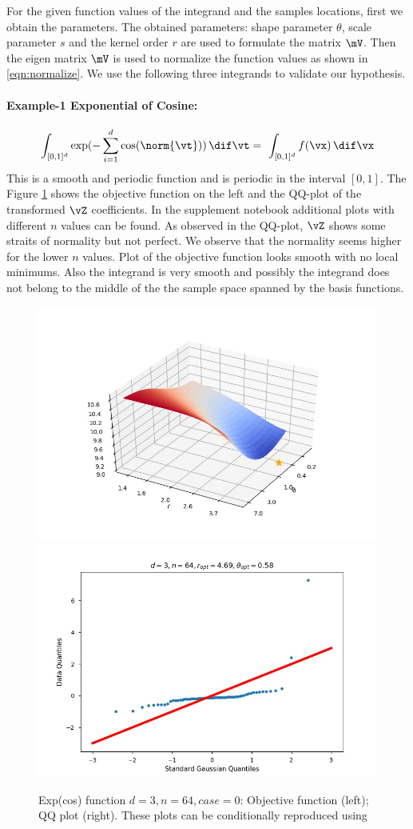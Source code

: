 For the given function values of the integrand and the samples locations, first we obtain the parameters. The obtained parameters: shape parameter $\theta$,  scale parameter $s$ and the kernel order $r$ are used to formulate the matrix $\mV$. Then the eigen matrix $\mV$ is used to normalize the function values as shown in \eqref{eqn:normalize}.
We use the following three integrands to validate our hypothesis.  

\paragraph{
Example-1 Exponential of Cosine:}
\begin{equation*}
\int_{[0,1]^{d}}  \exp( - \sum_{i=1}^d\cos(\norm{\vt}) ) \, \dif \vt
= \ \int_{[0,1]^{d}} 
f(\vx) \, 
\dif \vx 
\end{equation*}
This is a smooth and periodic function and is periodic in the interval $[0,1]$. The Figure \ref{fig:expcos_plots} shows the objective function on the left and the QQ-plot of the transformed $\vZ$ coefficients. In the supplement notebook  additional plots with different $n$ values can be found. As observed in the QQ-plot, $\vZ$ shows some straits of normality but not perfect. We observe that the normality seems higher for the lower $n$ values. Plot of the objective function looks smooth with no local minimums. Also the integrand is very smooth and possibly the integrand does not belong to the middle of the the sample space spanned by the basis functions.
\begin{figure}[ht]
	\centering
	\includegraphics[width=0.45\linewidth]{BayesCub/figures/ExpCos-ObjFun_n-64_d-3_case-0.jpg} \quad 
	\includegraphics[width=0.45\linewidth]{BayesCub/figures/ExpCos-QQPlot_n-64_d-3_case-0.jpg}
	\caption{Exp(cos) function $d=3, n=64, case=0$: Objective function (left);  QQ plot (right).  These plots can be conditionally reproduced using }
	\label{fig:expcos_plots}
\end{figure}




